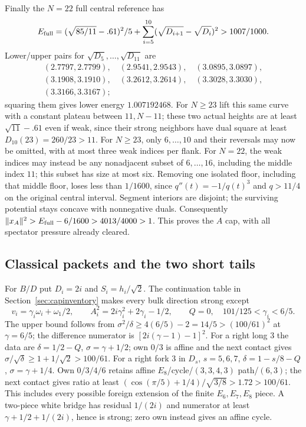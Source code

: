 \documentclass[11pt]{article}
\theoremstyle{remark}
\begin{document}
Finally the $N=22$ full central reference has
\[
 E_{\rm full}=(\sqrt{85/11}-.61)^2/5+
       \sum_{i=5}^{10}(\sqrt{D_{i+1}}-\sqrt{D_i})^2>1007/1000.
\]
Lower/upper pairs for $\sqrt{D_5},\ldots,\sqrt{D_{11}}$ are
\[
\begin{gathered}
(2.7797,2.7799),\quad(2.9541,2.9543),\quad(3.0895,3.0897),\\
(3.1908,3.1910),\quad(3.2612,3.2614),\quad(3.3028,3.3030),\\
(3.3166,3.3167);
\end{gathered}
\]
squaring them gives lower energy $1.007192468$.
For $N\ge23$ lift this same curve with a constant plateau between
$11,N-11$; these two actual heights are at least $\sqrt{11}-.61$
even if weak, since their strong neighbors have dual square at least
$D_{10}(23)=260/23>11$.
For $N\ge23$, only $6,\ldots,10$ and their reversals may now be omitted,
with at most three weak indices per flank. For $N=22$, the weak indices
may instead be any nonadjacent subset of $6,\ldots,16$, including the
middle index $11$; this subset has size at most six.
Removing one isolated floor, including that middle floor, loses
less than $1/1600$, since $q''(t)=-1/q(t)^3$ and $q>11/4$ on
the original central interval. Segment interiors are disjoint;
the surviving potential stays concave with nonnegative duals.
Consequently $\|x_A\|^2>E_{\rm full}-6/1600>4013/4000>1$.
This proves the $A$ cap, with all spectator pressure already cleared.

\subsection{Classical packets and the two short tails}
\label{sec:BDcaps}

For $B/D$ put $D_i=2i$ and $S_i=h_i/\sqrt2$.
The continuation table in Section~\ref{sec:capinventory} makes every
bulk direction strong except
\begin{equation}\label{eq:capclassicalpacket}
 v_i=\gamma_i\omega_i+\omega_1/2,\qquad
 A_i^2=2i\gamma_i^2+2\gamma_i-1/2,\qquad Q=0,
 \quad101/125<\gamma_i<6/5.
\end{equation}
The upper bound follows from
$\sigma^2/\delta\ge4(6/5)-2=14/5>(100/61)^2$ at $\gamma=6/5$;
the difference numerator is $[2i(\gamma-1)-1]^2$.
For a right long $3$ the data are
$\delta=1/2-Q$, $\sigma=\gamma+1/2$; own $0/3$ is affine and
the next contact gives $\sigma/\sqrt\delta\ge1+1/\sqrt2>100/61$.
For a right fork $3$ in $D_s$, $s=5,6,7$,
$\delta=1-s/8-Q$, $\sigma=\gamma+1/4$.
Own $0/3/4/6$ retains affine $E_8$/cycle/$(3,3,4,3)$ path/$(6,3)$;
the next contact gives ratio at least
$(\cos(\pi/5)+1/4)/\sqrt{3/8}>1.72>100/61$.
This includes every possible foreign extension of the finite
$E_6,E_7,E_8$ piece. A two-piece white bridge has residual
$1/(2i)$ and numerator at least $\gamma+1/2+1/(2i)$, hence is
strong; zero own instead gives an affine cycle.
\end{document}
